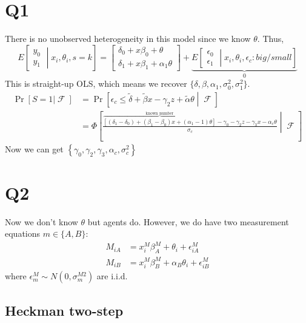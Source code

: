 \documentclass[11pt,letterpaper]{article}
\DeclareMathOperator\F{\mathcal{F}}
\begin{document}
\section{Q1}
There is no unobserved heterogeneity in this model since we know $\theta$. Thus,
\[
E\left[ \begin{matrix} y_{0} \\ y_{1} \end{matrix} \middle | x_i,\theta_i, s=k \right]
=
\begin{bmatrix} 
	\delta_0 + x\beta_0 + \theta         \\  
	\delta_1 + x\beta_1 + \alpha_1\theta 
\end{bmatrix} + 
\underbrace{E\left[ \begin{matrix} \epsilon_{0} \\ \epsilon_{1} \end{matrix} \middle | x_i,\theta_i, \epsilon_c:big/small \right]}_{0}
\]
This is straight-up OLS, which means we recover $\{\delta, \beta, \alpha_1, \sigma^2_0, \sigma^2_1\}$. 
\begin{align*}
\Pr[S=1|\F] 
&= \Pr\left[\epsilon_c \leq \widetilde \delta + \widetilde \beta x - \gamma_2 z + \widetilde \alpha \theta \middle | \F\right] \\
&= \Phi\left[\frac{\overbrace{\left[(\delta_1 - \delta_0) + (\beta_1-\beta_0)x + (\alpha_1 - 1)\theta\right]}^{\text{known number}} -\gamma_0 - \gamma_2 z - \gamma_3 x - \alpha_c \theta }{\sigma_c} \middle | \F\right]
\end{align*}
Now we can get $\left\{ \gamma_0, \gamma_2, \gamma_3, \alpha_c, \sigma_c^2 \right\}$


\section{Q2}

Now we don't know $\theta$ but agents do. However, we do have two measurement equations $m \in \{A,B\}$:
\begin{align*}
M_{iA} &= x_i^M \beta_A^M + \theta_i + \epsilon_{iA}^M \\
M_{iB} &= x_i^M \beta_B^M + \alpha_B\theta_i + \epsilon_{iB}^M
\end{align*}
where $\epsilon_m^M \sim N(0,\sigma^{M2}_m)$ are i.i.d. 

\subsection{Heckman two-step}
\end{document}
